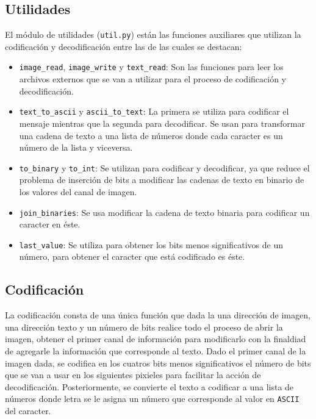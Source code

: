\documentclass[conference]{IEEEtran}
\begin{document}
	\subsection*{Utilidades}
	El módulo de utilidades (\texttt{util.py}) están las funciones auxiliares que utilizan la codificación y decodificación entre las de las cuales se destacan:
	\begin{itemize}
	    \item \texttt{image\_read}\footnotemark, \texttt{image\_write} y \texttt{text\_read}: Son las funciones para leer los archivos externos que se van a utilizar para el proceso de codificación y decodificación.
         
	    	    
        \item \texttt{text\_to\_ascii} y \texttt{ascii\_to\_text}: La primera se utiliza para codificar el mensaje mientras que la segunda para decodificar. Se usan para transformar una cadena de texto a una lista de números donde cada caracter es un número de la lista y viceversa.
        
        \item \texttt{to\_binary} y \texttt{to\_int}: Se utilizan para codificar y decodificar, ya que reduce el problema de inserción de bits a modificar las cadenas de texto en binario de los valores del canal de imagen.
        
        \item \texttt{join\_binaries}: Se usa modificar la cadena de texto binaria para codificar un caracter en éste.
        
        \item \texttt{last\_value}: Se utiliza para obtener los bits menos significativos de un número, para obtener el caracter que está codificado es éste.
	\end{itemize}
	
	\subsection*{Codificación}
        La codificación consta de una única función que dada la una dirección de imagen, una dirección texto y un número de bits realice todo el proceso de abrir la imagen, obtener el primer canal de información para modificarlo con la finaldiad de agregarle la información que corresponde al texto.
        Dado el primer canal de la imagen dada, se codifica en los cuatros bits menos significativos el número de bits que se van a usar en los siguientes pixieles para facilitar la acción de decodificación.
        Posteriormente, se convierte el texto a codificar a una lista de números donde letra se le asigna un número que corresponde al valor en \texttt{ASCII} del caracter.
    
\end{document}
